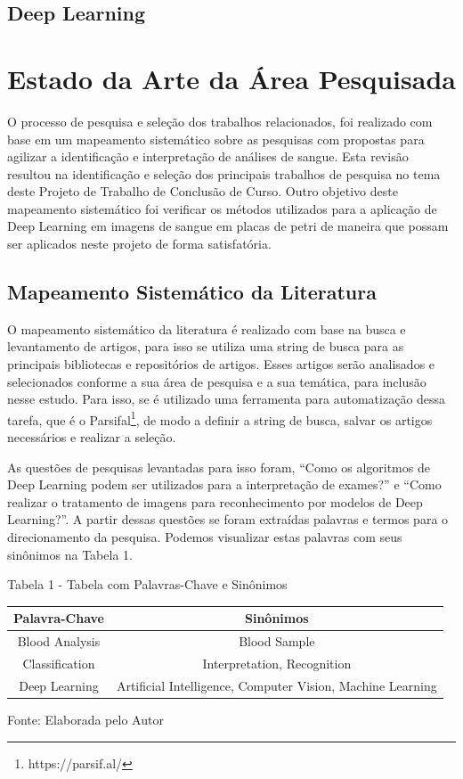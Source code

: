 \section{Deep Learning}
\label{sec:conceito2}

\chapter{Estado da Arte da Área Pesquisada}
\label{chap:mapeamento}

O processo de pesquisa e seleção dos trabalhos relacionados, foi realizado com base em um mapeamento sistemático sobre as pesquisas com propostas para agilizar a identificação e interpretação de análises de sangue. Esta revisão resultou na identificação e seleção dos principais trabalhos de pesquisa no tema deste Projeto de Trabalho de Conclusão de Curso. Outro objetivo deste mapeamento sistemático foi verificar os métodos utilizados para a aplicação de Deep Learning em imagens de sangue em placas de petri de maneira que possam ser aplicados neste projeto de forma satisfatória.

\section{Mapeamento Sistemático da Literatura}

O mapeamento sistemático da literatura é realizado com base na busca e levantamento de artigos, para isso se utiliza uma string de busca para as principais bibliotecas e repositórios de artigos. Esses artigos serão analisados e selecionados conforme a sua área de pesquisa e a sua temática, para inclusão nesse estudo. Para isso, se é utilizado uma ferramenta para automatização dessa tarefa, que é o Parsifal\footnote[1]{https://parsif.al/}, de modo a definir a string de busca, salvar os artigos necessários e realizar a seleção.

As questões de pesquisas levantadas para isso foram, ``Como os algoritmos de Deep Learning podem ser utilizados para a interpretação de exames?'' e ``Como realizar o tratamento de imagens para reconhecimento por modelos de Deep Learning?''. A partir dessas questões se foram extraídas palavras e termos para o direcionamento da pesquisa. Podemos visualizar estas palavras com seus sinônimos na Tabela 1.

\begin{center}
Tabela 1 - Tabela com Palavras-Chave e Sinônimos
\begin{center}
\begin{tabular}{|c|c|}
\hline
\textbf{Palavra-Chave} & \textbf{Sinônimos} \\ \hline
Blood Analysis & Blood Sample \\ \hline
Classification & Interpretation, Recognition \\ \hline
Deep Learning & Artificial Intelligence, Computer Vision, Machine Learning \\ \hline
\end{tabular}
\end{center}
Fonte: Elaborada pelo Autor
\end{center}

